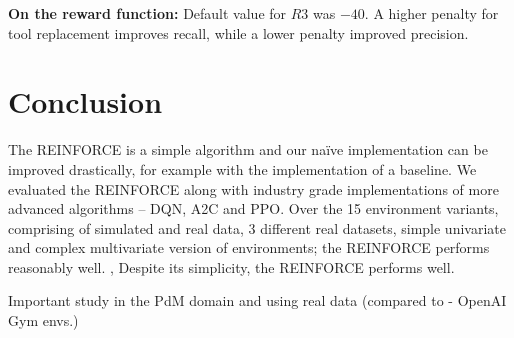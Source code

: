 \documentclass[a4paper, 12pt]{article}
\begin{document}
\textbf{On the reward function:} Default value for $R3$ was $-40$. A higher penalty for tool replacement improves recall, while a lower penalty improved precision.
 
%

\section{Conclusion}\label{sec:Conclusion}
The REINFORCE is a simple algorithm and our na\"ive implementation can be improved drastically, for example with the implementation of a baseline. We evaluated the REINFORCE along with industry grade implementations of more advanced algorithms -- DQN, A2C and PPO. Over the 15 environment variants, comprising of simulated and real data, 3 different real datasets, simple univariate and complex multivariate version of environments; the REINFORCE performs reasonably well.  , Despite its simplicity, the REINFORCE performs well.   

Important study in the PdM domain and using real data (compared to \cite{duan2016benchmarking} - OpenAI Gym envs.)

\newpage


\end{document}
